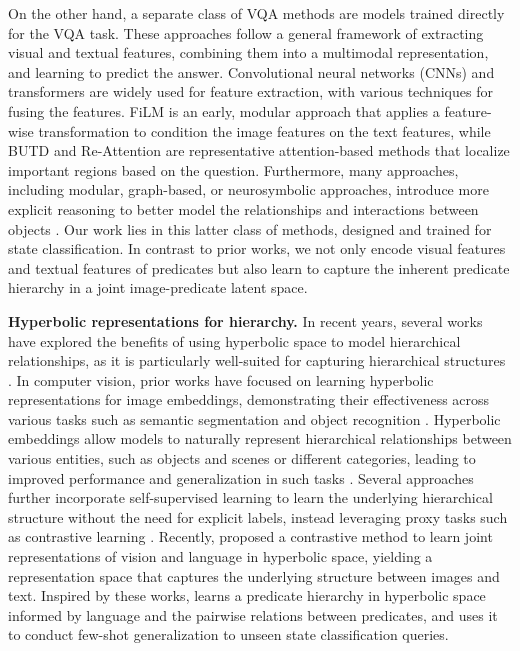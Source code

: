 On the other hand, a separate class of VQA methods are models trained directly for the VQA task. These approaches follow a general framework of extracting visual and textual features, combining them into a multimodal representation, and learning to predict the answer. Convolutional neural networks (CNNs) and transformers are widely used for feature extraction, with various techniques for fusing the features. FiLM \citep{perez2018film} is an early, modular approach that applies a feature-wise transformation to condition the image features on the text features, while BUTD \citep{anderson2018butd} and Re-Attention \citep{guo2020reattention} are representative attention-based methods that localize important regions based on the question. Furthermore, many approaches, including modular, graph-based, or neurosymbolic approaches, introduce more explicit reasoning to better model the relationships and interactions between objects \citep{andreas2016neural, yi2018neural, ma2022relvit, nguyen2022coarse, wang2023vqa}. Our work lies in this latter class of methods, designed and trained for state classification. In contrast to prior works, we not only encode visual features and textual features of predicates but also learn to capture the inherent predicate hierarchy in a joint image-predicate latent space.

\vspace{-0.1cm}
\textbf{Hyperbolic representations for hierarchy.}
In recent years, several works have explored the benefits of using hyperbolic space to model hierarchical relationships, as it is particularly well-suited for capturing hierarchical structures \citep{ganea2018hyperbolic, nickel2018learning}. In computer vision, prior works have focused on learning hyperbolic representations for image embeddings, demonstrating their effectiveness across various tasks such as semantic segmentation and object recognition \citep{khrulkov2020hyperbolic, liu2020hyperbolic, atigh2022hyperbolic, ermolov2022hyperbolic, Ge_2023_CVPR}. Hyperbolic embeddings allow models to naturally represent hierarchical relationships between various entities, such as objects and scenes or different categories, leading to improved performance and generalization in such tasks \citep{weng2021unsupervised, Ge_2023_CVPR}. Several approaches further incorporate self-supervised learning to learn the underlying hierarchical structure without the need for explicit labels, instead leveraging proxy tasks such as contrastive learning \citep{hsu2021capturingimplicithierarchicalstructure, Ge_2023_CVPR, yue2023hyperbolic}. Recently, \citet{desai2023hyperbolic} proposed a contrastive method to learn joint representations of vision and language in hyperbolic space, yielding a representation space that captures the underlying structure between images and text. Inspired by these works, \model learns a predicate hierarchy in hyperbolic space informed by language and the pairwise relations between predicates, and uses it to conduct few-shot generalization to unseen state classification queries. 
%
%